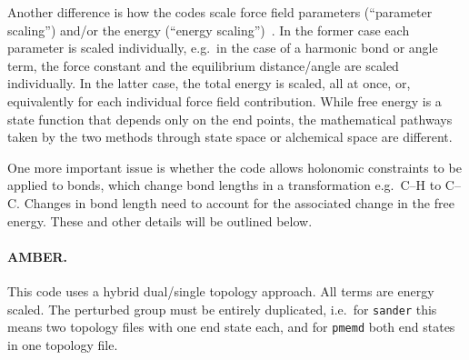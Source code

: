 \documentclass[journal=jctcce,manuscript=article]{achemso}
\newcommand{\progname}[1]{\texttt{#1}}
\begin{document}
Another difference is how the codes scale force field parameters (``parameter
scaling'') and/or the energy (``energy
scaling'')~\cite{doi:10.1021/jp981628n}.  In the former case each parameter is
scaled individually, e.g.\ in the case of a harmonic bond or angle term,
the force constant and the equilibrium distance/angle are scaled
individually.  In the
latter case, the total energy is scaled, all at once, or, equivalently for each
individual force field contribution.  While free energy is a state function that
depends only on the end points, the mathematical pathways taken by the
two methods through state space or alchemical space are different.

One more important issue is whether the code allows holonomic constraints to be applied
to bonds, which change bond lengths in a transformation e.g.\ C--H to C--C.
Changes in bond length need to account for the associated change in the free
energy.  These and other details will be outlined below.

\paragraph{AMBER.}
This code uses a hybrid dual/single topology approach.  All terms are energy scaled.
The perturbed group must be entirely duplicated, i.e.\ for
\progname{sander} this means two topology files with one end state each, and for \progname{pmemd} both end states in one topology file.
\end{document}
